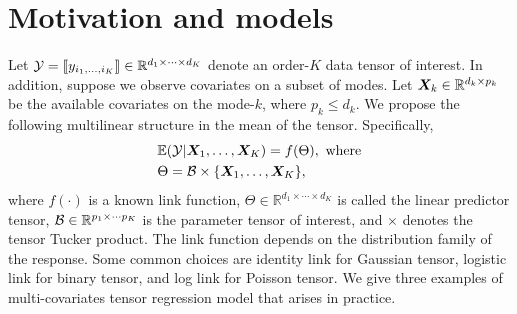 \documentclass[11pt]{article}
\theoremstyle{plain}
\theoremstyle{definition}
\begin{document}
\section{Motivation and models}
Let $\mathcal{Y}=\llbracket y_{i_1,\ldots,i_K} \rrbracket\in\mathbb{R}^{d_1\times \cdots\times d_K}$ denote an order-$K$ data tensor of interest. In addition, suppose we observe covariates on a subset of modes. Let $\bm X_k\in\mathbb{R}^{d_k\times p_k}$ be the available covariates on the mode-$k$, where $p_k\leq d_k$. We propose the following multilinear structure in the mean of the tensor. Specifically, 
\begin{align}\label{eq:tensormodel}
&\mathbb{E}(\mathcal{Y}|\bm X_1,\ldots,\bm X_K)=f(\Theta),\ \text{where}\\
&\Theta =\mathcal{B}\times\{\bm X_1,\ldots,\bm X_K\} ,
\end{align}
where $f(\cdot)$ is a known link function, $\Theta\in\mathbb{R}^{d_1\times \cdots\times d_K}$ is called the linear predictor tensor, $\mathcal{B}\in\mathbb{R}^{p_1\times \cdots p_K}$ is the parameter tensor of interest, and $\times$ denotes the tensor Tucker product. The link function depends on the distribution family of the response. Some common choices are identity link for Gaussian tensor, logistic link for binary tensor, and log link for Poisson tensor. We give three examples of multi-covariates tensor regression model that arises in practice. 
\end{document}
